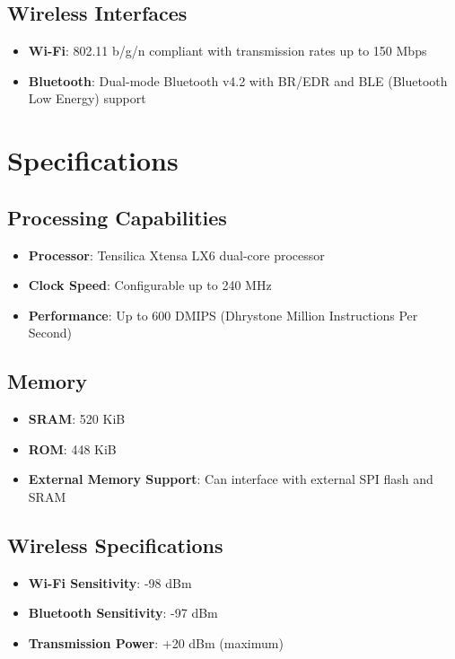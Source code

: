 \subsection{Wireless Interfaces}
\begin{itemize}
	\item \textbf{Wi-Fi}: 802.11 b/g/n compliant with transmission rates up to 150 Mbps
	\item \textbf{Bluetooth}: Dual-mode Bluetooth v4.2 with BR/EDR and BLE (Bluetooth Low Energy) support
\end{itemize}

\section{Specifications}

\subsection{Processing Capabilities}
\begin{itemize}
	\item \textbf{Processor}: Tensilica Xtensa LX6 dual-core processor
	\item \textbf{Clock Speed}: Configurable up to 240 MHz
	\item \textbf{Performance}: Up to 600 DMIPS (Dhrystone Million Instructions Per Second)
\end{itemize}

\subsection{Memory}
\begin{itemize}
	\item \textbf{SRAM}: 520 KiB
	\item \textbf{ROM}: 448 KiB
	\item \textbf{External Memory Support}: Can interface with external SPI flash and SRAM
\end{itemize}

\subsection{Wireless Specifications}
\begin{itemize}
	\item \textbf{Wi-Fi Sensitivity}: -98 dBm
	\item \textbf{Bluetooth Sensitivity}: -97 dBm
	\item \textbf{Transmission Power}: +20 dBm (maximum) \cite{Espressif:2023}
\end{itemize}

